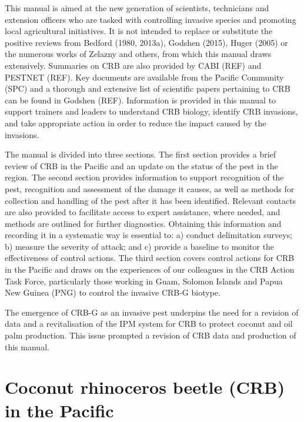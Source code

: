 \documentclass[twocolumn,letterpaper]{scrartcl}
\begin{document}
This manual is aimed at the new generation of scientists, technicians and extension officers who are tasked 
with controlling invasive species and promoting local agricultural initiatives. It is not intended to replace or 
substitute  the  positive  reviews  from  Bedford  (1980,  2013a),  Godshen  (2015),  Huger  (2005)  or  the  numerous 
works of Zelazny and others, from which this manual draws extensively. Summaries on CRB are also provided 
by CABI (REF) and PESTNET (REF). Key documents 
are available from the Pacific Community (SPC) and a thorough and extensive list of scientific papers pertaining 
to CRB can be found in Godshen (REF). Information is provided in this manual to support trainers and leaders 
to understand CRB biology, identify CRB invasions, and take appropriate action in order to reduce the impact 
caused by the invasions. 

The manual is divided into three sections. The first section provides a brief review of CRB in the Pacific and an 
update on the status of the pest in the region. The second section provides information to support recognition of 
the pest, recognition and assessment of the damage it causes, as well as methods for collection and handling of 
the pest after it has been identified. Relevant contacts are also provided to facilitate access to expert assistance, 
where needed, and methods are outlined for further diagnostics. Obtaining this information and recording 
it in a systematic way is essential to: a) conduct delimitation surveys; b) measure the severity of attack; and c) 
provide a baseline to monitor the effectiveness of control actions. The third section covers control actions for 
CRB in the Pacific and draws on the experiences of our colleagues in the CRB Action Task Force, particularly 
those working in Guam, Solomon Islands and Papua New Guinea (PNG) to control the invasive CRB-G biotype. 

The emergence of CRB-G as an invasive pest underpins the need for a revision of data and a revitalisation of the 
IPM system for CRB to protect coconut and oil palm production. This issue prompted a revision of CRB data and 
production of this manual.
%
%

\section{Coconut rhinoceros beetle (CRB) in the Pacific}
\end{document}
